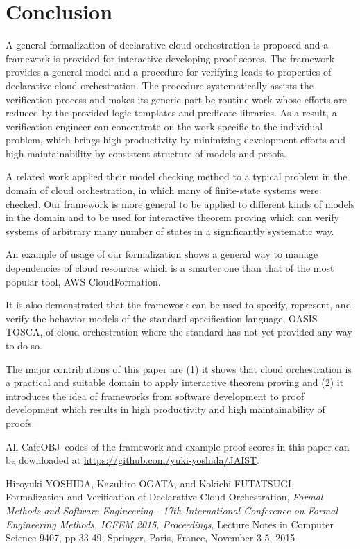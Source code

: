 \documentclass[12pt]{report}
\newcommand{\cafeobj}{{\sf CafeOBJ}~}
\begin{document}
\section{Conclusion}
A general formalization of declarative cloud orchestration is proposed
and a framework is provided for interactive developing proof
scores. The framework provides a general model and a procedure for
verifying leads-to properties of declarative cloud orchestration.  The
procedure systematically assists the verification process and makes
its generic part be routine work whose efforts are reduced by the
provided logic templates and predicate libraries. As a result, a
verification engineer can concentrate on the work specific to the
individual problem, which brings high productivity by minimizing
development efforts and high maintainability by consistent structure
of models and proofs.

A related work applied their model checking method to a typical
problem in the domain of cloud orchestration, in which many of
finite-state systems were checked. Our framework is more general to be
applied to different kinds of models in the domain and to be used for
interactive theorem proving which can verify systems of arbitrary many
number of states in a significantly systematic way.

An example of usage of our formalization shows a general way to manage
dependencies of cloud resources which is a smarter one than that of
the most popular tool, AWS CloudFormation.

It is also demonstrated that the framework can be used to specify,
represent, and verify the behavior models of the standard
specification language, OASIS TOSCA, of cloud orchestration where the
standard has not yet provided any way to do so.

The major contributions of this paper are (1) it shows that cloud
orchestration is a practical and suitable domain to apply interactive
theorem proving and (2) it introduces the idea of frameworks from
software development to proof development which results in high
productivity and high maintainability of proofs.

All \cafeobj codes of the framework and example proof scores in this paper
can be downloaded at \url{https://github.com/yuki-yoshida/JAIST}.

\appendix




\begin{publication}

\item
Hiroyuki YOSHIDA, Kazuhiro OGATA, and Kokichi FUTATSUGI,
Formalization and Verification of Declarative Cloud Orchestration,
\emph{Formal Methods and Software Engineering - 17th International Conference
               on Formal Engineering Methods, {ICFEM} 2015, Proceedings}, 
Lecture Notes in Computer Science 9407,
pp 33-49, 
Springer,
Paris, France,
November 3-5, 2015

\end{publication}
\end{document}
